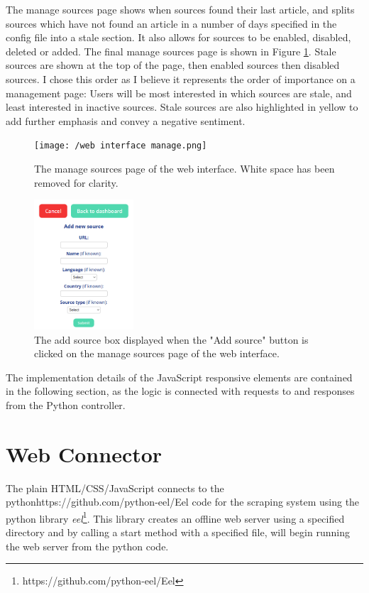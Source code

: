 \documentclass{l4proj}
\begin{document}
The manage sources page shows when sources found their last article, and splits sources which have not found an article in a number of days specified in the config file into a stale section. It also allows for sources to be enabled, disabled, deleted or added. The final manage sources page is shown in Figure \ref{fig:web-interface-manage}. Stale sources are shown at the top of the page, then enabled sources then disabled sources. I chose this order as I believe it represents the order of importance on a management page: Users will be most interested in which sources are stale, and least interested in inactive sources. Stale sources are also highlighted in yellow to add further emphasis and convey a negative sentiment. 

\begin{figure}[!ht]
\centering
\texttt{[image: /web interface manage.png]}
\caption{The manage sources page of the web interface. White space has been removed for clarity.}
\label{fig:web-interface-manage}
\end{figure}

\begin{figure}[!ht]
\centering
\includegraphics[width=0.33\textwidth]{images/add-source-box.png}
\caption{The add source box displayed when the "Add source" button is clicked on the manage sources page of the web interface.}
\label{fig:add-sources-box}
\end{figure}

The implementation details of the JavaScript responsive elements are contained in the following section, as the logic is connected with requests to and responses from the Python controller.

\section{Web Connector}
The plain HTML/CSS/JavaScript connects to the pythonhttps://github.com/python-eel/Eel code for the scraping system using the python library \emph{eel}\footnote{https://github.com/python-eel/Eel}. This library creates an offline web server using a specified directory and by calling a start method with a specified file, will begin running the web server from the python code.
\end{document}

